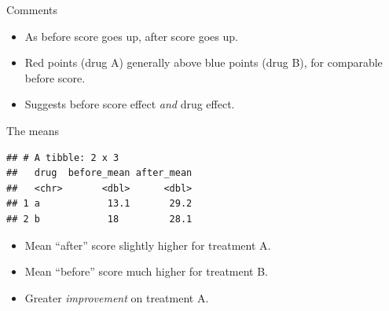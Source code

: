 \documentclass[ignorenonframetext,]{beamer}
\newenvironment{Shaded}{\begin{snugshade}}{\end{snugshade}}
\newcommand{\DataTypeTok}[1]{\textcolor[rgb]{0.13,0.29,0.53}{#1}}
\newcommand{\KeywordTok}[1]{\textcolor[rgb]{0.13,0.29,0.53}{\textbf{#1}}}
\newcommand{\NormalTok}[1]{#1}
\newcommand{\OperatorTok}[1]{\textcolor[rgb]{0.81,0.36,0.00}{\textbf{#1}}}
\newcommand{\StringTok}[1]{\textcolor[rgb]{0.31,0.60,0.02}{#1}}
\begin{document}
\begin{frame}{Comments}
\protect\hypertarget{comments-18}{}

\begin{itemize}
\item
  As before score goes up, after score goes up.
\item
  Red points (drug A) generally above blue points (drug B), for
  comparable before score.
\item
  Suggests before score effect \emph{and} drug effect.
\end{itemize}

\end{frame}

\begin{frame}[fragile]{The means}
\protect\hypertarget{the-means}{}

\begin{Shaded}
\end{Shaded}

\begin{verbatim}
## # A tibble: 2 x 3
##   drug  before_mean after_mean
##   <chr>       <dbl>      <dbl>
## 1 a            13.1       29.2
## 2 b            18         28.1
\end{verbatim}

\begin{itemize}
\item
  Mean ``after'' score slightly higher for treatment A.
\item
  Mean ``before'' score much higher for treatment B.
\item
  Greater \emph{improvement} on treatment A.
\end{itemize}

\end{frame}
\end{document}
